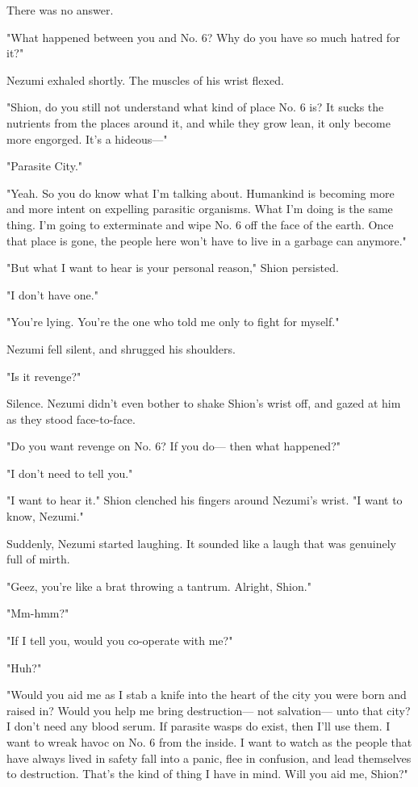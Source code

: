 There was no answer.

"What happened between you and No. 6? Why do you have so much hatred for
it?"

Nezumi exhaled shortly. The muscles of his wrist flexed.

"Shion, do you still not understand what kind of place No. 6 is? It
sucks the nutrients from the places around it, and while they grow lean,
it only become more engorged. It's a hideous---"

"Parasite City."

"Yeah. So you do know what I'm talking about. Humankind is becoming more
and more intent on expelling parasitic organisms. What I'm doing is the
same thing. I'm going to exterminate and wipe No. 6 off the face of the
earth. Once that place is gone, the people here won't have to live in a
garbage can anymore."

"But what I want to hear is your personal reason," Shion persisted.

"I don't have one."

"You're lying. You're the one who told me only to fight for myself."

Nezumi fell silent, and shrugged his shoulders.

"Is it revenge?"

Silence. Nezumi didn't even bother to shake Shion's wrist off, and gazed
at him as they stood face-to-face.

"Do you want revenge on No. 6? If you do--- then what happened?"

"I don't need to tell you."

"I want to hear it." Shion clenched his fingers around Nezumi's wrist.
"I want to know, Nezumi."

Suddenly, Nezumi started laughing. It sounded like a laugh that was
genuinely full of mirth.

"Geez, you're like a brat throwing a tantrum. Alright, Shion."

"Mm-hmm?"

"If I tell you, would you co-operate with me?"

"Huh?"

"Would you aid me as I stab a knife into the heart of the city you were
born and raised in? Would you help me bring destruction--- not salvation---
unto that city? I don't need any blood serum. If parasite wasps do
exist, then I'll use them. I want to wreak havoc on No. 6 from the
inside. I want to watch as the people that have always lived in safety
fall into a panic, flee in confusion, and lead themselves to
destruction. That's the kind of thing I have in mind. Will you aid me,
Shion?"


